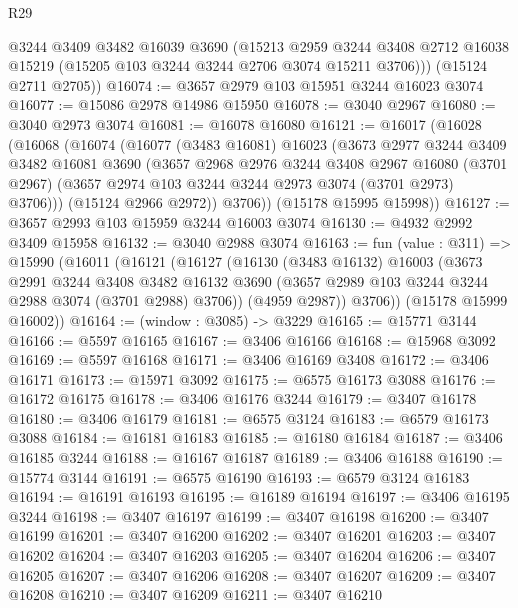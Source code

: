 \begin{lexlean}{R29}
\begin{coremodule}
        @3244
        @3409
        @3482
        @16039
        @3690
        (@15213
          @2959
          @3244
          @3408
          @2712
          @16038
          @15219
          (@15205 @103 @3244 @3244 @2706 @3074 @15211 @3706)))
      (@15124 @2711 @2705))
@16074 := @3657 @2979 @103 @15951 @3244 @16023 @3074
@16077 := @15086 @2978 @14986 @15950
@16078 := @3040 @2967
@16080 := @3040 @2973 @3074
@16081 := @16078 @16080
@16121 := @16017
    (@16028
      (@16068
        (@16074
          (@16077
            (@3483 @16081)
            @16023
            (@3673
              @2977
              @3244
              @3409
              @3482
              @16081
              @3690
              (@3657
                @2968
                @2976
                @3244
                @3408
                @2967
                @16080
                (@3701 @2967)
                (@3657 @2974 @103 @3244 @3244 @2973 @3074 (@3701 @2973) @3706)))
            (@15124 @2966 @2972))
          @3706))
      (@15178 @15995 @15998))
@16127 := @3657 @2993 @103 @15959 @3244 @16003 @3074
@16130 := @4932 @2992 @3409 @15958
@16132 := @3040 @2988 @3074
@16163 := fun (value : @311) =>
  @15990
    (@16011
      (@16121
        (@16127
          (@16130
            (@3483 @16132)
            @16003
            (@3673
              @2991
              @3244
              @3408
              @3482
              @16132
              @3690
              (@3657 @2989 @103 @3244 @3244 @2988 @3074 (@3701 @2988) @3706))
            (@4959 @2987))
          @3706))
      (@15178 @15999 @16002))
@16164 := (window : @3085) -> @3229
@16165 := @15771 @3144
@16166 := @5597 @16165
@16167 := @3406 @16166
@16168 := @15968 @3092
@16169 := @5597 @16168
@16171 := @3406 @16169 @3408
@16172 := @3406 @16171
@16173 := @15971 @3092
@16175 := @6575 @16173 @3088
@16176 := @16172 @16175
@16178 := @3406 @16176 @3244
@16179 := @3407 @16178
@16180 := @3406 @16179
@16181 := @6575 @3124
@16183 := @6579 @16173 @3088
@16184 := @16181 @16183
@16185 := @16180 @16184
@16187 := @3406 @16185 @3244
@16188 := @16167 @16187
@16189 := @3406 @16188
@16190 := @15774 @3144
@16191 := @6575 @16190
@16193 := @6579 @3124 @16183
@16194 := @16191 @16193
@16195 := @16189 @16194
@16197 := @3406 @16195 @3244
@16198 := @3407 @16197
@16199 := @3407 @16198
@16200 := @3407 @16199
@16201 := @3407 @16200
@16202 := @3407 @16201
@16203 := @3407 @16202
@16204 := @3407 @16203
@16205 := @3407 @16204
@16206 := @3407 @16205
@16207 := @3407 @16206
@16208 := @3407 @16207
@16209 := @3407 @16208
@16210 := @3407 @16209
@16211 := @3407 @16210

\end{coremodule}
\end{lexlean}
